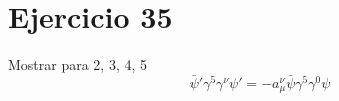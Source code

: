 \section*{Ejercicio 35}
Mostrar para 2, 3, 4, 5
\begin{equation*}
{\bar{\psi}}' \gamma^5 \gamma^\nu {\psi}' = -a^\nu_\mu \bar{\psi} \gamma^5 \gamma^0 \psi
\end{equation*}